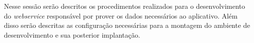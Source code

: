 
	\par Nesse sessão serão descritos os procedimentos realizados para o
desenvolvimento do \textit{webservice} responsável por prover os dados
necessários ao aplicativo. Além disso serão descritas as configuração
necessárias para a montagem do ambiente de desenvolvimento e sua
posterior implantação.